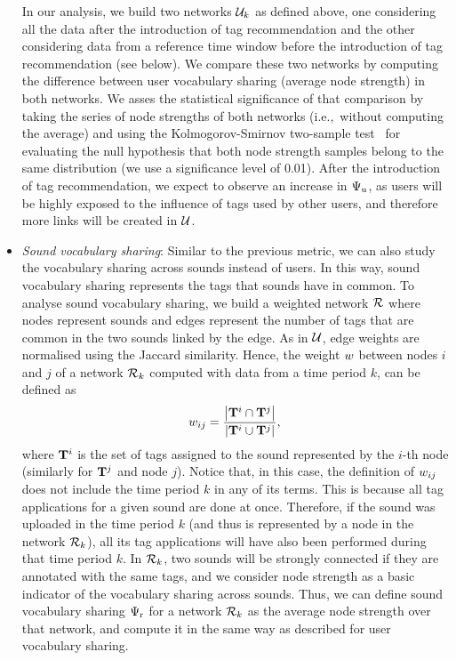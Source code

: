 \begin{itemize}
In our analysis, we build two networks $\mathcal{U}_k$ as defined above, one considering all the data after the introduction of tag recommendation and the other considering data from a reference time window before the introduction of tag recommendation (see below). We compare these two networks by computing the difference between user vocabulary sharing (average node strength) in both networks. We asses the statistical significance of that comparison by taking the series of node strengths of both networks (i.e.,~without computing the average) and using the Kolmogorov-Smirnov two-sample test~\citep{Corder2009} for evaluating the null hypothesis that both node strength samples belong to the same distribution (we use a significance level of 0.01). After the introduction of tag recommendation, we expect to observe an increase in $\Psi_{\text{u}}$, as users will be highly exposed to the influence of tags used by other users, and therefore more links will be created in $\mathcal{U}$.

	\item \textit{Sound vocabulary sharing}: Similar to the previous metric, we can also study the vocabulary sharing across sounds instead of users. In this way, sound vocabulary sharing represents the tags that sounds have in common. To analyse sound vocabulary sharing, we build a weighted network $\mathcal{R}$ where nodes represent sounds and edges represent the number of tags that are common in the two sounds linked by the edge. As in $\mathcal{U}$, edge weights are normalised using the Jaccard similarity. Hence, the weight $w$ between nodes $i$ and $j$ of a network $\mathcal{R}_k$ computed with data from a time period $k$, can be defined as
\begin{equation} w_{ij} = \frac{ \left\vert \mathbf{T}^{i} \cap \mathbf{T}^{j} \right\vert }{ \left\vert \mathbf{T}^{i} \cup \mathbf{T}^{j} \right\vert }, \label{impact:eq:weight_sound_sharing} \end{equation}
where $\mathbf{T}^{i}$ is the set of tags assigned to the sound represented by the $i$-th node (similarly for $\mathbf{T}^{j}$ and node $j$). Notice that, in this case, the definition of $w_{ij}$ does not include the time period $k$ in any of its terms. This is because all tag applications for a given sound are done at once. Therefore, if the sound was uploaded in the time period $k$ (and thus is represented by a node in the network $\mathcal{R}_k$), all its tag applications will have also been performed during that time period $k$. In $\mathcal{R}_k$, two sounds will be strongly connected if they are annotated with the same tags, and we consider node strength as a basic indicator of the vocabulary sharing across sounds. 
Thus, we can define sound vocabulary sharing $\Psi_{\text{r}}$ for a network $\mathcal{R}_k$ as the average node strength over that network, and compute it in the same way as described for user vocabulary sharing.


\end{itemize}
